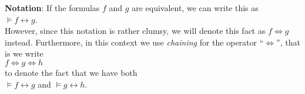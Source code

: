 \noindent
\textbf{Notation}:  If the formulas $f$ and $g$ are equivalent, we can write this as 
\\[0.2cm]
\hspace*{1.3cm}
$\models f \leftrightarrow g$.
\\[0.2cm]
However, since this notation is rather clumsy, we will denote this fact as $f \Leftrightarrow g$ instead.
Furthermore, in this context we use \emph{chaining} for the operator ``$\Leftrightarrow$'', that is we write
\\[0.2cm]
\hspace*{1.3cm}
$f \Leftrightarrow g \Leftrightarrow h$
\\[0.2cm]
to denote the fact that we have both
\\[0.2cm]
\hspace*{1.3cm}
$\models f \leftrightarrow g$ \quad and \quad  $\models g \leftrightarrow h$. \eox



